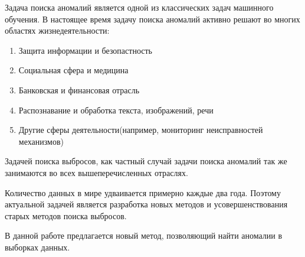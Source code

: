 \Introduction

Задача поиска аномалий является одной из классических задач машинного обучения. В настоящее время задачу поиска аномалий активно решают во многих областях жизнедеятельности:
\begin{enumerate} 
	\item Защита информации и безопастность
	\item Социальная сфера и медицина
	\item Банковская и финансовая отрасль
	\item Распознавание и обработка текста, изображений, речи
	\item Другие сферы деятельности(например, мониторинг неисправностей механизмов)
\end{enumerate}
Задачей поиска выбросов, как частный случай задачи поиска аномалий так же занимаются во всех вышеперечисленных отраслях. 

Количество данных в мире удваивается примерно каждые два года. Поэтому актуальной задачей является разработка новых методов и усовершенствования старых методов поиска выбросов.

В данной работе предлагается новый метод, позволяющий найти аномалии в выборках данных.





